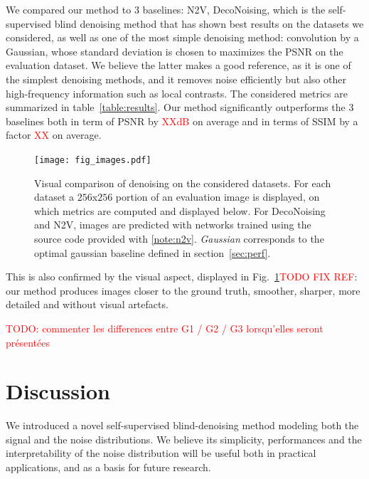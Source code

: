\documentclass{article}
\begin{document}
We compared our method to 3 baselines: N2V, DecoNoising, which is the self-supervised blind denoising method that has shown best results on the datasets we considered, as well as one of the most simple denoising method: convolution by a Gaussian, whose standard deviation is chosen to maximizes the PSNR on the evaluation dataset.
We believe the latter makes a good reference, as it is one of the simplest denoising methods, and it removes noise efficiently but also other high-frequency information such as local contrasts.
The considered metrics are summarized in table~\ref{table:results}.
Our method significantly outperforms the 3 baselines both in term of PSNR by \textcolor{red}{XXdB} on average and in terms of SSIM by a factor \textcolor{red}{XX} on average.

\begin{figure}[ht]
\label{fig:images}
\vskip 0.2in
\begin{center}
\texttt{[image: fig\_images.pdf]}
\caption{Visual comparison of denoising on the considered datasets. For each dataset a $256$x$256$ portion of an evaluation image is displayed, on which metrics are computed and displayed below. For DecoNoising and N2V, images are predicted with networks trained using the source code provided with \cite{goncharova2020}\cref{note:n2v}. \textit{Gaussian} corresponds to the optimal gaussian baseline defined in section~\ref{sec:perf}.}
\end{center}
\vskip -0.2in

\end{figure}

This is also confirmed by the visual aspect, displayed in Fig.~\ref{fig:images}\textcolor{red}{TODO FIX REF}: our method produces images closer to the ground truth, smoother, sharper, more detailed and without visual artefacts.

\textcolor{red}{TODO: commenter les differences entre G1 / G2 / G3 lorsqu'elles seront présentées}


\section{Discussion}
We introduced a novel self-supervised blind-denoising method modeling both the signal and the noise distributions. We believe its simplicity, performances and the interpretability of the noise distribution will be useful both in practical applications, and as a basis for future research.
\end{document}
